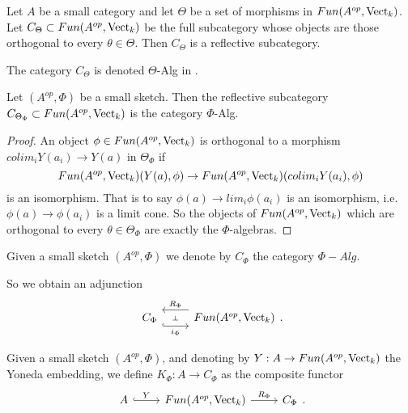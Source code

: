 \begin{theorem}\cite[Theorem 6.5]{kelly/basic-concepts-enriched}\label{reflective}

  \noindent Let $A$ be a small category and let $\Theta$ be a set of morphisms
  in $Fun(A^{op},\operatorname{Vect}_k)$. Let $C_{\Theta}\subset Fun(A^{op},\operatorname{Vect}_k)$ be the
  full subcategory whose objects are those orthogonal to every
  $\theta\in\Theta$. Then $C_{\Theta}$ is a reflective subcategory.
\end{theorem}

\begin{remark}
  The category $C_{\Theta}$ is denoted $\Theta$-Alg in
  \cite{kelly/basic-concepts-enriched}.
\end{remark}


\begin{lemma}\cite[Theorem 6.11]{kelly/basic-concepts-enriched}
  Let $(A^{op},\Phi)$ be a small sketch. Then the reflective subcategory
  $C_{\Theta_{\Phi}}\subset Fun(A^{op},\operatorname{Vect}_k)$ is the category $\Phi$-Alg.
\end{lemma}

\begin{proof}
  An object $\phi \in Fun(A^{op},\operatorname{Vect}_k)$ is orthogonal to a morphism
  $colim_i Y(a_i)\to Y(a)$ in $\Theta_{\Phi}$
  if $$Fun(A^{op},\operatorname{Vect}_k)(Y(a),\phi)\to Fun(A^{op},\operatorname{Vect}_k)(colim_i
  Y(a_i),\phi)$$ is an isomorphism. That is to say $\phi(a)\to lim_i
  \phi(a_i)$ is an isomorphism, i.e. $\phi(a)\to \phi(a_i)$ is a limit cone.
  So the objects of $Fun(A^{op},\operatorname{Vect}_k)$ which are orthogonal to every
  $\theta\in \Theta_{\Phi}$ are exactly the $\Phi$-algebras.
\end{proof}

\begin{definition}

  \noindent Given a small sketch $(A^{op},\Phi)$ we denote by $C_{\Phi}$ the
  category $\Phi-Alg$.
\end{definition}


So we obtain an adjunction
\[\begin{tikzcd}
            {C_{\Phi}} & {Fun(A^{op},\Vect_k)}
            \arrow[""{name=0, anchor=center, inner sep=0}, "i_{\Phi}"', shift right=3, hook, from=1-1, to=1-2]
            \arrow[""{name=1, anchor=center, inner sep=0}, "R_{\Phi}"', shift right=3, from=1-2, to=1-1]
            \arrow["\dashv"{anchor=center, rotate=-90}, draw=none, from=1, to=0]
\end{tikzcd}.
\]

\begin{definition}

  \noindent Given a small sketch $(A^{op},\Phi)$, and denoting by $Y:A\to
  Fun(A^{op},\operatorname{Vect}_k)$ the Yoneda embedding, we define $K_{\Phi}:A\to
  C_{\Phi}$ as the composite functor
  \[
    \begin{tikzcd} A &
    {Fun(A^{op},\Vect_k)} & {C_{\Phi}} \arrow["Y", hook, from=1-1, to=1-2]
    \arrow["R_{\Phi}", from=1-2, to=1-3]
    \end{tikzcd}.
  \]
\end{definition}

